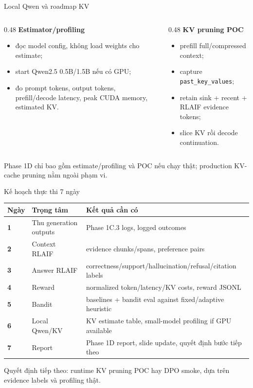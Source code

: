 \documentclass[aspectratio=169,10pt]{beamer}
\newcommand{\smallcode}[1]{\texttt{\scriptsize #1}}
\newcommand{\minihead}[1]{{\bfseries\color{AccentDark}#1}}
\newcommand{\takeaway}[1]{%
  \vspace{0.46em}
  \noindent\colorbox{Soft}{%
    \parbox{\dimexpr\linewidth-2\fboxsep}{\color{Ink}\strut #1\strut}%
  }%
}
\newenvironment{tightitemize}{\begin{itemize}\setlength{\itemsep}{0.22em}\setlength{\parskip}{0pt}}{\end{itemize}}
\begin{document}
\begin{frame}{Local Qwen và roadmap KV}
  \small
  \begin{columns}[T,onlytextwidth]
    \begin{column}{0.48\textwidth}
      \minihead{Estimator/profiling}
      \begin{tightitemize}
        \item đọc model config, không load weights cho estimate;
        \item start Qwen2.5 0.5B/1.5B nếu có GPU;
        \item đo prompt tokens, output tokens, prefill/decode latency, peak CUDA memory, estimated KV.
      \end{tightitemize}
    \end{column}
    \begin{column}{0.48\textwidth}
      \minihead{KV pruning POC}
      \begin{tightitemize}
        \item prefill full/compressed context;
        \item capture \smallcode{past\_key\_values};
        \item retain sink + recent + RLAIF evidence tokens;
        \item slice KV rồi decode continuation.
      \end{tightitemize}
    \end{column}
  \end{columns}
  \takeaway{Phase 1D chỉ bao gồm estimate/profiling và POC nếu chạy thật; production KV-cache pruning nằm ngoài phạm vi.}
\end{frame}

\begin{frame}{Kế hoạch thực thi 7 ngày}
  \scriptsize
  \setlength{\tabcolsep}{4pt}
  \renewcommand{\arraystretch}{1.18}
  \begin{tabular}{>{\bfseries}p{}p{}p{}}
    \toprule
    Ngày & Trọng tâm & Kết quả cần có \\
    \midrule
    1 & Thu generation outputs & Phase 1C.3 logs, logged outcomes \\
    2 & Context RLAIF & evidence chunks/spans, preference pairs \\
    3 & Answer RLAIF & correctness/support/hallucination/refusal/citation labels \\
    4 & Reward & normalized token/latency/KV costs, reward JSONL \\
    5 & Bandit & baselines + bandit eval against fixed/adaptive heuristic \\
    6 & Local Qwen/KV & KV estimate table, small-model profiling if GPU available \\
    7 & Report & Phase 1D report, slide update, quyết định bước tiếp theo \\
    \bottomrule
  \end{tabular}

  \vspace{0.42cm}
  \centering
  \small\color{Muted}
  Quyết định tiếp theo: runtime KV pruning POC hay DPO smoke, dựa trên evidence labels và profiling thật.
\end{frame}
\end{document}
